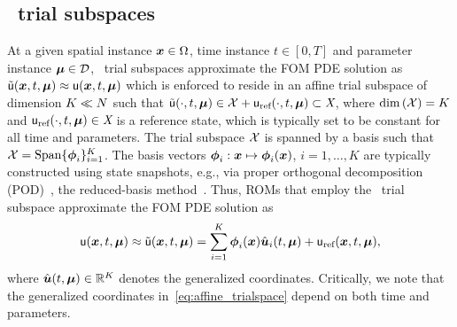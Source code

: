 \documentclass[3p,computermodern,10pt]{elsarticle}
\begin{document}
\subsection{\spatialAcronym\ trial subspaces}
At a given spatial instance $\boldsymbol x \in \Omega$, time instance 
$t\in[0,T]$ and parameter instance $\boldsymbol \mu \in \mathcal{D}$,
\spatialAcronym\ trial subspaces approximate the FOM PDE solution
as $\tilde{\mathsf{u}}(\boldsymbol x, t,\boldsymbol \mu) \approx \mathsf{u}(\boldsymbol x, t,\boldsymbol \mu)$ which is enforced to reside in an affine 
trial subspace of dimension $K\ll N$ such that 
$\tilde{\mathsf{u}}(\cdot,t,\boldsymbol \mu) \in \mathcal{X} + \mathsf{u}_{\text{ref}}(\cdot,t,\boldsymbol \mu) \subset \textit{X}$, where $\dim{(\mathcal{X})} = K$ and 
$\mathsf{u}_{\text{ref}}(\cdot,t,\boldsymbol \mu) \in \textit{X}$ is a reference state, which is typically set to be constant for all time and parameters. 
The trial subspace
$\mathcal{X}$ 
is spanned by a basis such that
$ \mathcal{X}= \text{Span}\{\boldsymbol \phi_i\}_{i=1}^{K}$.
The basis vectors $\boldsymbol \phi_i: \boldsymbol x \mapsto \boldsymbol \phi_i(\boldsymbol x)$, $i=1,\ldots,K$ are typically constructed
using state snapshots, e.g., via
proper orthogonal decomposition (POD)~\cite{berkooz_turbulence_pod}, the reduced-basis method~\cite{rb_1,rb_2,rb_3,NgocCuong2005,Rozza2008}. 
Thus, ROMs that employ the  \spatialAcronym\
trial subspace approximate the FOM PDE solution as
\begin{equation}\label{eq:affine_trialspace}
\mathsf{u}(\boldsymbol x, t,\boldsymbol \mu)  \approx \tilde{\mathsf{u}}(\boldsymbol x, t,\boldsymbol \mu) = \sum_{i=1}^{K} \boldsymbol \phi_i(\boldsymbol x) \hat{\boldsymbol u}_i(t,\boldsymbol \mu) + \mathsf{u}_{\text{ref}}(\boldsymbol x,t,\boldsymbol \mu),
\end{equation}
where $\hat{\boldsymbol u}(t,\boldsymbol \mu) \in \mathbb{R}^{K}$ denotes the generalized
coordinates. Critically, we note that the generalized coordinates in~\eqref{eq:affine_trialspace} depend on both time and parameters.
\end{document}
